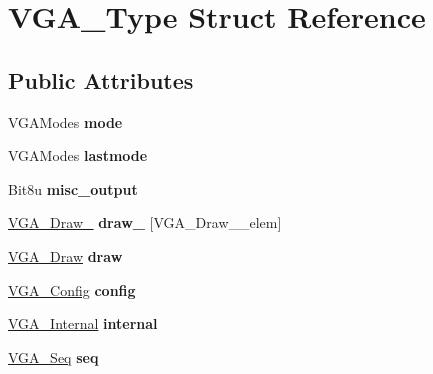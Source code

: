 \hypertarget{structVGA__Type}{\section{V\-G\-A\-\_\-\-Type Struct Reference}
\label{structVGA__Type}
}
\subsection*{Public Attributes}
\begin{DoxyCompactItemize}
\item 
\hypertarget{structVGA__Type_a44fe81559bf3a4c349f8a9759b527a35}{V\-G\-A\-Modes {\bfseries mode}}\label{structVGA__Type_a44fe81559bf3a4c349f8a9759b527a35}

\item 
\hypertarget{structVGA__Type_aa49e9fe907d3d3772a4045c03a442e27}{V\-G\-A\-Modes {\bfseries lastmode}}\label{structVGA__Type_aa49e9fe907d3d3772a4045c03a442e27}

\item 
\hypertarget{structVGA__Type_a1d41608f9c718ba6b7214280a1ef5f42}{Bit8u {\bfseries misc\-\_\-output}}\label{structVGA__Type_a1d41608f9c718ba6b7214280a1ef5f42}

\item 
\hypertarget{structVGA__Type_a51e755f98349a94a27d8908efd8b9965}{\hyperlink{structVGA__Draw__2}{V\-G\-A\-\_\-\-Draw\-\_} {\bfseries draw\-\_} \mbox{[}V\-G\-A\-\_\-\-Draw\-\_\-\_\-elem\mbox{]}}\label{structVGA__Type_a51e755f98349a94a27d8908efd8b9965}

\item 
\hypertarget{structVGA__Type_ae457a2c4a9d5c9f6f44446fb3f55821e}{\hyperlink{structVGA__Draw}{V\-G\-A\-\_\-\-Draw} {\bfseries draw}}\label{structVGA__Type_ae457a2c4a9d5c9f6f44446fb3f55821e}

\item 
\hypertarget{structVGA__Type_a0038dc10fed9d08aa6bfae50ecf37ff1}{\hyperlink{structVGA__Config}{V\-G\-A\-\_\-\-Config} {\bfseries config}}\label{structVGA__Type_a0038dc10fed9d08aa6bfae50ecf37ff1}

\item 
\hypertarget{structVGA__Type_a24ba9a206ab7c173bf2efb041f96dde7}{\hyperlink{structVGA__Internal}{V\-G\-A\-\_\-\-Internal} {\bfseries internal}}\label{structVGA__Type_a24ba9a206ab7c173bf2efb041f96dde7}

\item 
\hypertarget{structVGA__Type_ad27712fc3d8783827ec3a4a546175f7a}{\hyperlink{structVGA__Seq}{V\-G\-A\-\_\-\-Seq} {\bfseries seq}}\label{structVGA__Type_ad27712fc3d8783827ec3a4a546175f7a}


\end{DoxyCompactItemize}
